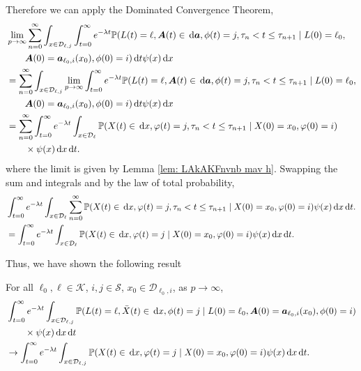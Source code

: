 Therefore we can apply the Dominated Convergence Theorem, 
\begin{align}
	&\lim_{p\to\infty} \sum_{n=0}^\infty\int_{x\in\mathcal D_{\ell,j}}\int_{t=0}^\infty e^{-\lambda t} \mathbb P(L(t) = \ell, \boldsymbol A(t) \in \, \mathrm{d} \boldsymbol a, \phi(t) = j, \tau_{n}< t \leq\tau_{n+1} \mid L(0)=\ell_0, \nonumber
	\\&\qquad{}\boldsymbol A(0)=\boldsymbol  a_{\ell_0,i}(x_0), \phi(0)=i)\, \mathrm{d} t \psi(x) \, \mathrm{d} x \nonumber
	\\&= \sum_{n=0}^\infty\int_{x\in\mathcal D_{\ell,j}}\lim_{p\to\infty} \int_{t=0}^\infty e^{-\lambda t} \mathbb P(L(t) = \ell, \boldsymbol A(t) \in \, \mathrm{d} \boldsymbol a, \phi(t) = j, \tau_{n}< t \leq\tau_{n+1} \mid L(0)=\ell_0, \nonumber
	\\&\qquad{}\boldsymbol A(0)=\boldsymbol  a_{\ell_0,i}(x_0), \phi(0)=i)\, \mathrm{d} t \psi(x) \, \mathrm{d} x \nonumber
	\\&= \sum_{n=0}^\infty\int_{t=0}^\infty e^{-\lambda t}  \int_{x\in\mathcal{D}_\ell}\mathbb P(X(t)\in\, \mathrm{d} x, \varphi(t)=j, \tau_n < t \leq \tau_{n+1}  
	\mid X(0)=x_0, \varphi(0)=i) \nonumber 
	\\&\qquad{}\times \psi(x)\, \mathrm{d} x\, \mathrm{d} t. \nonumber
\end{align}
where the limit is given by Lemma \ref{lem: LAkAKFnvnb mav h}. Swapping the sum and integrals and by the law of total probability, 
\begin{align}
	& \int_{t=0}^\infty e^{-\lambda t}  \int_{x\in\mathcal{D}_\ell}\sum_{n=0}^\infty\mathbb P(X(t)\in\, \mathrm{d} x, \varphi(t)=j, \tau_n < t \leq \tau_{n+1}  
	\mid X(0)=x_0, \varphi(0)=i)\psi(x)\, \mathrm{d} x\, \mathrm{d} t. \nonumber
	\\&= \int_{t=0}^\infty e^{-\lambda t}  \int_{x\in\mathcal{D}_\ell} \mathbb P(X(t)\in\, \mathrm{d} x, \varphi(t)=j  
	\mid X(0)=x_0, \varphi(0)=i)\psi(x)\, \mathrm{d} x\, \mathrm{d} t. \nonumber
\end{align}

Thus, we have shown the following result
\begin{lem}\label{lem: KajPOw}
	For all \(\ell_0,\ell\in\mathcal K\), \(i,j\in\mathcal S\), \(x_0\in\mathcal D_{\ell_0,i}\), as \(p\to\infty\), 
	\begin{align}
		&\int_{t=0}^\infty e^{-\lambda t}\int_{x\in\mathcal D_{\ell,j}}\mathbb P(L(t) = \ell, \bar X(t) \in \, \mathrm{d} x, \phi(t) = j \mid L(0)=\ell_0, \boldsymbol A(0)=\boldsymbol  a_{\ell_0,i}(x_0), \phi(0)=i) \nonumber 
		\\&\qquad{} \times \psi(x)\, \mathrm{d} x\, \mathrm{d} t \nonumber
		\\&\to \int_{t=0}^\infty e^{-\lambda t}  \int_{x\in\mathcal{D}_{\ell,j}} \mathbb P(X(t)\in\, \mathrm{d} x, \varphi(t)=j  
		\mid X(0)=x_0, \varphi(0)=i)\psi(x)\, \mathrm{d} x\, \mathrm{d} t. \nonumber
	\end{align}
\end{lem}

